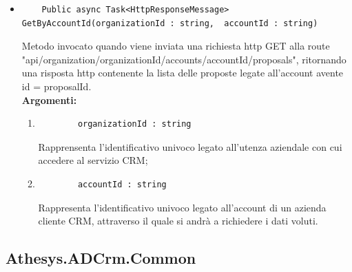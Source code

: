 \begin{itemize}
	\item 
	\begin{lstlisting}
	Public async Task<HttpResponseMessage> GetByAccountId(organizationId : string,  accountId : string)
	\end{lstlisting}
	Metodo invocato quando viene inviata una richiesta \gls{http} GET alla route "api/organization/{organizationId}/accounts/{accountId}/proposals", ritornando una risposta \gls{http} contenente la lista delle proposte legate all'account avente id = {proposalId}.\\
	\textbf{\small Argomenti:}
	\begin{enumerate}[leftmargin=*]
		\itemsep0em 
		\item 
		\begin{lstlisting}
		organizationId : string 
		\end{lstlisting}
		Rapprensenta l'identificativo univoco legato all'utenza aziendale con cui accedere al servizio CRM;
		\item 
		\begin{lstlisting}
		accountId : string
		\end{lstlisting}
		Rappresenta l'identificativo univoco legato all'account di un azienda cliente CRM, attraverso il quale si andrà a richiedere i dati voluti.
	\end{enumerate}
\end{itemize}

\vfill
\subsection{Athesys.ADCrm.Common}

